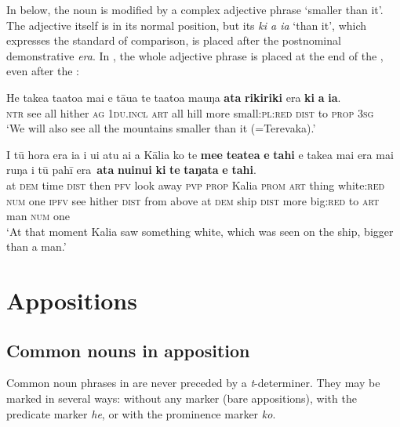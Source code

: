 In  below, the noun is modified by a complex adjective phrase ‘smaller than it’. The adjective itself is in its normal position, but its  \textit{ki a ia} ‘than it’, which expresses the standard of comparison, is placed after the postnominal demonstrative \textit{era}. In , the whole adjective phrase is placed at the end of the , even after the :

\ea\label{ex:5.163}
\gll He take{\ꞌ}a ta{\ꞌ}ato{\ꞌ}a mai e tāua te ta{\ꞌ}ato{\ꞌ}a ma{\ꞌ}uŋa \textbf{{\ꞌ}ata} \textbf{rikiriki} era  \textbf{ki} \textbf{a} \textbf{ia}.\\
\textsc{ntr} see all hither \textsc{ag} \textsc{1du.incl} \textsc{art} all hill more small:\textsc{pl}:\textsc{red} \textsc{dist}  to \textsc{prop} \textsc{3sg}\\

\glt 
‘We will also see all the mountains smaller than it (=Terevaka).’ \textstyleExampleref{[R314.002]} 
\z

\ea\label{ex:5.164}
\gll {\ꞌ}I tū hora era ia i u{\ꞌ}i atu ai a Kālia ko te \textbf{me{\ꞌ}e} \textbf{teatea} \textbf{e} \textbf{tahi} {\ob}e take{\ꞌ}a mai era mai ruŋa i tū pahī era\,{\cb} \textbf{{\ꞌ}ata} \textbf{nuinui} \textbf{ki} \textbf{te} \textbf{taŋata} \textbf{e} \textbf{tahi}.\\
at \textsc{dem} time \textsc{dist} then \textsc{pfv} look away \textsc{pvp} \textsc{prop} Kalia \textsc{prom} \textsc{art} thing white:\textsc{red}  \textsc{num} one {\db}\textsc{ipfv} see hither \textsc{dist} from above at \textsc{dem} ship \textsc{dist} more big:\textsc{red} to \textsc{art} man \textsc{num} one\\

\glt 
‘At that moment Kalia saw something white, which was seen on the ship, bigger than a man.’ \textstyleExampleref{[R345.061]}\textstyleExampleref{} 
\z
{}
\section{Appositions}\label{sec:5.12}
\subsection{Common nouns in apposition}\label{sec:5.12.1}
Common noun phrases in  are never preceded by a \textit{t}{}-determiner. They may be marked in several ways: without any marker (bare appositions), with the predicate marker \textit{he}, or with the prominence marker \textit{ko}.

